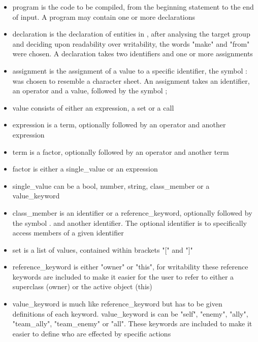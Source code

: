 \begin{itemize}
\item program is the code to be compiled, from the beginning statement to the end of input.
A program may contain one or more declarations

\item declaration is the declaration of entities in \langname{}, after analysing the target group
and deciding upon readability over writability, the words "make" and "from" were chosen.
A declaration takes two identifiers and one or more assignments

\item assignment is the assignment of a value to a specific identifier, the symbol : was chosen
to resemble a character sheet.
An assignment takes an identifier, an operator and a value, followed by the symbol ;

\item value consists of either an expression, a set or a call

\item expression is a term, optionally followed by an operator and another expression

\item term is a factor, optionally followed by an operator and another term

\item factor is either a single\_value or an expression

\item single\_value can be a bool, number, string, class\_member or a value\_keyword

\item class\_member is an identifier or a reference\_keyword, optionally followed
by the symbol . and another identifier. The optional identifier is to specifically access members
of a given identifier

\item set is a list of values, contained within brackets "[" and "]"

\item reference\_keyword is either "owner" or "this", for writability these reference keywords are included
to make it easier for the user to refer to either a superclass (owner) or the active object (this)

\item value\_keyword is much like reference\_keyword but has to be given definitions of each keyword.
value\_keyword is can be "self", "enemy", "ally", "team\_ally", "team\_enemy" or "all".
These keywords are included to make it easier to define who are effected by specific actions


\end{itemize}
